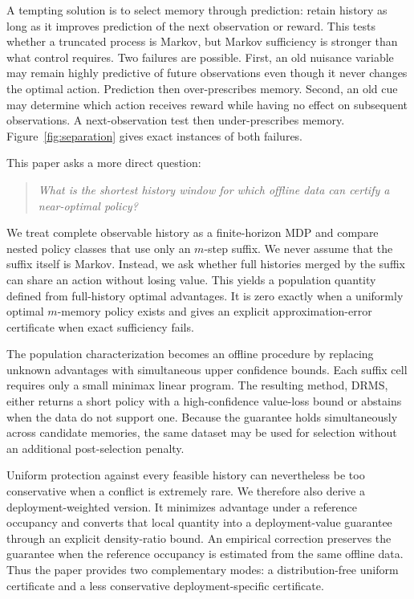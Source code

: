 \documentclass[letterpaper]{article} %
\theoremstyle{remark}
\newcommand{\DRMS}{\textnormal{\textsc{DRMS}}}
\begin{document}
A tempting solution is to select memory through prediction: retain history as
long as it improves prediction of the next observation or reward. This tests
whether a truncated process is Markov, but Markov sufficiency is stronger than
what control requires. Two failures are possible. First, an old nuisance
variable may remain highly predictive of future observations even though it
never changes the optimal action. Prediction then over-prescribes memory.
Second, an old cue may determine which action receives reward while having no
effect on subsequent observations. A next-observation test then under-prescribes
memory. Figure~\ref{fig:separation} gives exact instances of both failures.

This paper asks a more direct question:
\begin{quote}
\emph{What is the shortest history window for which offline data can certify a
near-optimal policy?}
\end{quote}
We treat complete observable history as a finite-horizon MDP and compare
nested policy classes that use only an $m$-step suffix. We never assume that
the suffix itself is Markov. Instead, we ask whether full histories merged by
the suffix can share an action without losing value. This yields a population
quantity defined from full-history optimal advantages. It is zero exactly when
a uniformly optimal $m$-memory policy exists and gives an explicit
approximation-error certificate when exact sufficiency fails.

The population characterization becomes an offline procedure by replacing
unknown advantages with simultaneous upper confidence bounds. Each suffix
cell requires only a small minimax linear program. The resulting method,
\DRMS, either returns a short policy with a high-confidence value-loss bound or
abstains when the data do not support one. Because the guarantee holds
simultaneously across candidate memories, the same dataset may be used for
selection without an additional post-selection penalty.

Uniform protection against every feasible history can nevertheless be too
conservative when a conflict is extremely rare. We therefore also derive a
deployment-weighted version. It minimizes advantage under a reference
occupancy and converts that local quantity into a deployment-value guarantee
through an explicit density-ratio bound. An empirical correction preserves
the guarantee when the reference occupancy is estimated from the same offline
data. Thus the paper provides two complementary modes: a distribution-free
uniform certificate and a less conservative deployment-specific certificate.
\end{document}
